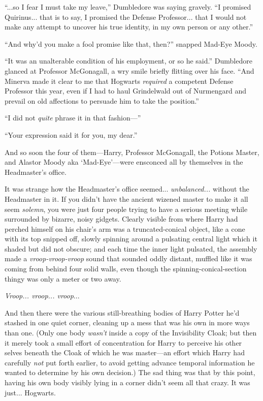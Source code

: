 “...so I fear I must take my leave,” Dumbledore was saying gravely. “I promised Quirinus... that is to say, I promised the Defense Professor... that I would not make any attempt to uncover his true identity, in my own person or any other.”

“And why’d you make a fool promise like that, then?” snapped Mad-Eye Moody.

“It was an unalterable condition of his employment, or so he said.” Dumbledore glanced at Professor McGonagall, a wry smile briefly flitting over his face. “And Minerva made it clear to me that Hogwarts \emph{required} a competent Defense Professor this year, even if I had to haul Grindelwald out of Nurmengard and prevail on old affections to persuade him to take the position.”

“I did not \emph{quite} phrase it in that fashion—”

“Your expression said it for you, my dear.”

And so soon the four of them—Harry, Professor McGonagall, the Potions Master, and Alastor Moody aka ‘Mad-Eye’—were ensconced all by themselves in the Headmaster’s office.

It was strange how the Headmaster’s office seemed... \emph{unbalanced...} without the Headmaster in it. If you didn’t have the ancient wizened master to make it all seem \emph{solemn}, you were just four people trying to have a serious meeting while surrounded by bizarre, noisy gidgets. Clearly visible from where Harry had perched himself on his chair’s arm was a truncated-conical object, like a cone with its top snipped off, slowly spinning around a pulsating central light which it shaded but did not obscure; and each time the inner light pulsated, the assembly made a \emph{vroop-vroop-vroop} sound that sounded oddly distant, muffled like it was coming from behind four solid walls, even though the spinning-conical-section thingy was only a meter or two away.

\emph{Vroop... vroop... vroop}...

And then there were the various still-breathing bodies of Harry Potter he’d stashed in one quiet corner, cleaning up a mess that was his own in more ways than one. (Only one body \emph{wasn’t} inside a copy of the Invisibility Cloak; but then it merely took a small effort of concentration for Harry to perceive his other selves beneath the Cloak of which he was master—an effort which Harry had carefully \emph{not} put forth earlier, to avoid getting advance temporal information he wanted to determine by his own decision.) The sad thing was that by this point, having his own body visibly lying in a corner didn’t seem all that crazy. It was just... Hogwarts.

